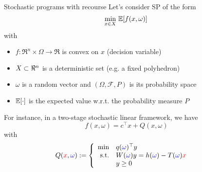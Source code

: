 \begin{frame}{Stochastic programs with recourse} 
Let's consider SP of the form
\[
\min_{x \in X}\, \mathbb{E}[f(x,\omega)]\,
\]
\pula
with
\begin{itemize}
\item $f:\Re^n\times \Omega \to \Re$ is convex on $x$ (decision variable)
\item $X \subset \Re^n$ is a deterministic set (e.g. a fixed polyhedron)
\item $\omega$ is a random vector and $(\Omega,\mathcal{F},P)$ is its probability space
\item $\mathbb{E}[\cdot]$ is the expected value w.r.t. the probability measure $P$
\end{itemize}
\pula
For instance, in a two-stage stochastic linear framework, we have
\[
f(x,\omega) = c^\top x + Q(x,\omega)
\]
with
\[Q({\color{red}x},{\color{blue}\omega}):=\left\{ \begin{array}{rll}
\min & q({\color{blue}\omega})^\top y &\\
\mbox{s.t.} & W({\color{blue}\omega}) y   =h({\color{blue}\omega})-T({\color{blue}\omega}){\color{red}x}&\\ 
& y  \geq 0  &
\end{array} \right.\]
\end{frame}


% 
%
%


